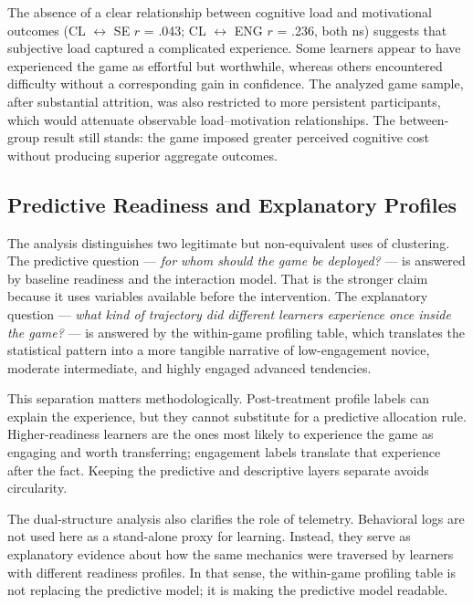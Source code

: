 \documentclass[12pt]{report}
\begin{document}
The absence of a clear relationship between cognitive load and motivational outcomes (CL $\leftrightarrow$ SE $r$ = .043; CL $\leftrightarrow$ ENG $r$ = .236, both ns) suggests that subjective load captured a complicated experience. Some learners appear to have experienced the game as effortful but worthwhile, whereas others encountered difficulty without a corresponding gain in confidence. The analyzed game sample, after substantial attrition, was also restricted to more persistent participants, which would attenuate observable load--motivation relationships. The between-group result still stands: the game imposed greater perceived cognitive cost without producing superior aggregate outcomes.

\subsection{Predictive Readiness and Explanatory Profiles}
The analysis distinguishes two legitimate but non-equivalent uses of clustering. The predictive question --- \textit{for whom should the game be deployed?} --- is answered by baseline readiness and the interaction model. That is the stronger claim because it uses variables available before the intervention. The explanatory question --- \textit{what kind of trajectory did different learners experience once inside the game?} --- is answered by the within-game profiling table, which translates the statistical pattern into a more tangible narrative of low-engagement novice, moderate intermediate, and highly engaged advanced tendencies.

This separation matters methodologically. Post-treatment profile labels can explain the experience, but they cannot substitute for a predictive allocation rule. Higher-readiness learners are the ones most likely to experience the game as engaging and worth transferring; engagement labels translate that experience after the fact. Keeping the predictive and descriptive layers separate avoids circularity.

The dual-structure analysis also clarifies the role of telemetry. Behavioral logs are not used here as a stand-alone proxy for learning. Instead, they serve as explanatory evidence about how the same mechanics were traversed by learners with different readiness profiles. In that sense, the within-game profiling table is not replacing the predictive model; it is making the predictive model readable.
\end{document}
